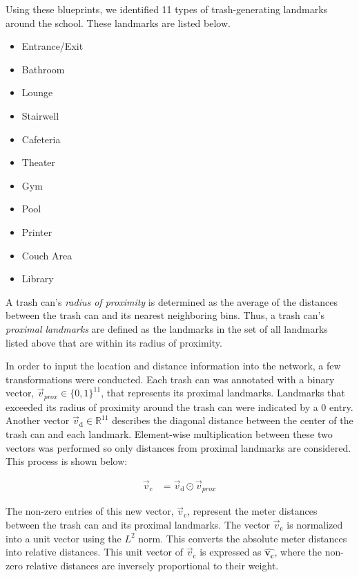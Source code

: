 \documentclass[conference]{ieeeconf}
\newcommand{\uvec}[1]{\boldsymbol{\hat{#1}}}
\begin{document}
Using these blueprints, we identified 11 types of trash-generating landmarks around the school. These landmarks are listed below.
\begin{itemize}
    \item Entrance/Exit
    \item Bathroom
    \item Lounge
    \item Stairwell
    \item Cafeteria
    \item Theater
    \item Gym
    \item Pool
    \item Printer
    \item Couch Area
    \item Library
\end{itemize}
A trash can's \emph{radius of proximity} is determined as the average of the distances between the trash can and its nearest neighboring bins. Thus, a trash can's \emph{proximal landmarks} are defined as the landmarks in the set of all landmarks listed above that are within its radius of proximity.

In order to input the location and distance information into the network, a few transformations were conducted. Each trash can was annotated with a binary vector, $\vec{v}_{prox}\in\{0,1\}^{11}$,  that represents its proximal landmarks. Landmarks that exceeded its radius of proximity around the trash can were indicated by a 0 entry. Another vector $\vec{v}_\text{d}\in\mathbb{R}^{11}$ describes the diagonal distance between the center of the trash can and each landmark. Element-wise multiplication between these two vectors was performed so only distances from proximal landmarks are considered. This process is shown below:

\begin{align*}
    \vec{v}_\text{c} &= \vec{v}_\text{d} \odot \vec{v}_{prox}
\end{align*}

The non-zero entries of this new vector, $\vec{v}_\text{c}$, represent the meter distances between the trash can and its proximal landmarks. The vector $\vec{v}_\text{c}$ is normalized into a unit vector using the $L^2$ norm. This converts the absolute meter distances into relative distances. This unit vector of $\vec{v}_\text{c}$ is expressed as $\uvec{v_\textbf{c}}$, where the non-zero relative distances are inversely proportional to their weight. 
\end{document}
